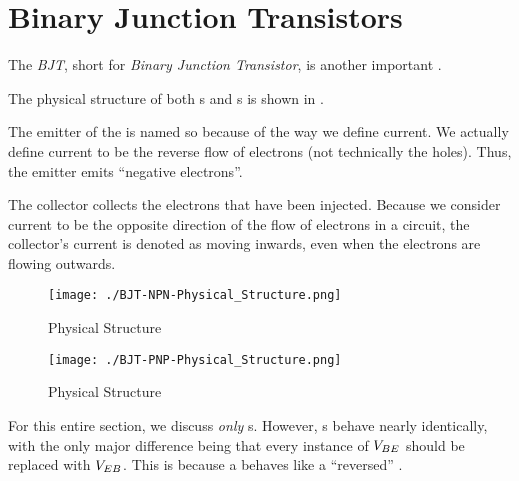 \section{Binary Junction Transistors}\label{sec:BJTs}
\begin{definition}[BJT]\label{def:BJT}
  The \emph{BJT}, short for \emph{Binary Junction Transistor}, is another important .

  The physical structure of both \NPNTransistor{}s and \PNPTransistor{}s is shown in .

  \begin{remark}
    The emitter of the  is named so because of the way we define current.
    We actually define current to be the reverse flow of electrons (not technically the holes).
    Thus, the emitter emits ``negative electrons''.

    The collector collects the electrons that have been injected.
    Because we consider current to be the opposite direction of the flow of electrons in a circuit, the collector's current is denoted as moving inwards, even when the electrons are flowing outwards.
  \end{remark}
\end{definition}

\begin{figure}[h!tbp]
  \centering
  \texttt{[image: ./BJT-NPN-Physical\_Structure.png]}
  \caption{\NPNTransistor{} Physical Structure \parencite[p.~307]{sedraTextbook7}}
  \label{fig:BJT-NPN-Physical_Structure}
\end{figure}

\begin{figure}[h!tbp]
  \centering
  \texttt{[image: ./BJT-PNP-Physical\_Structure.png]}
  \caption{\PNPTransistor{} Physical Structure \parencite[p.~307]{sedraTextbook7}}
  \label{fig:BJT-PNP-Physical_Structure}
\end{figure}

\begin{blackbox}
  For this entire section, we discuss \emph{only} \NPNTransistor{}s.
  However, \PNPTransistor{}s behave nearly identically, with the only major difference being that every instance of $V_{BE}$ should be replaced with $V_{EB}$.
  This is because a \PNPTransistor{} behaves like a ``reversed'' \NPNTransistor{}.
\end{blackbox}

